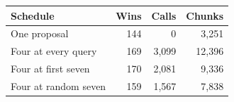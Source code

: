 \begin{tabular}{@{}lrrr@{}}\toprule
Schedule & Wins & Calls & Chunks \\ \midrule
One proposal & 144 & 0 & 3,251 \\
Four at every query & 169 & 3,099 & 12,396 \\
Four at first seven & 170 & 2,081 & 9,336 \\
Four at random seven & 159 & 1,567 & 7,838 \\
\bottomrule\end{tabular}
